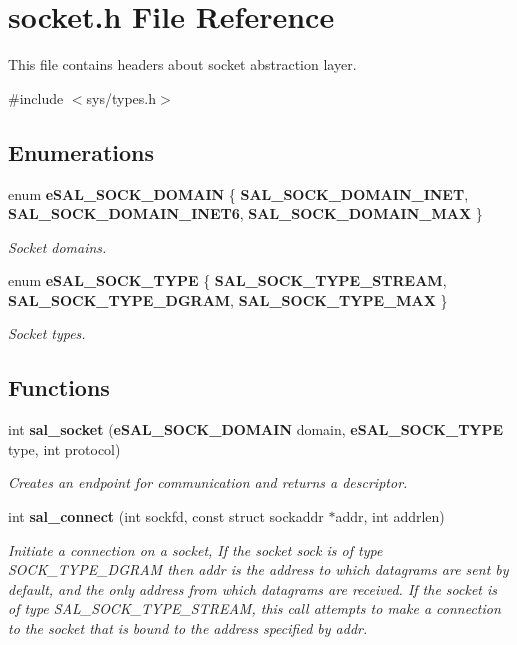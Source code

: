 \section{socket.h File Reference}
\label{socket_8h}


This file contains headers about socket abstraction layer.  


{\ttfamily \#include $<$sys/types.h$>$}\par
\subsection*{Enumerations}
\begin{DoxyCompactItemize}
\item 
enum {\bf eSAL\_\-SOCK\_\-DOMAIN} \{ {\bfseries SAL\_\-SOCK\_\-DOMAIN\_\-INET}, 
{\bfseries SAL\_\-SOCK\_\-DOMAIN\_\-INET6}, 
{\bfseries SAL\_\-SOCK\_\-DOMAIN\_\-MAX}
 \}
\begin{DoxyCompactList}\small\item\em Socket domains. \end{DoxyCompactList}\item 
enum {\bf eSAL\_\-SOCK\_\-TYPE} \{ {\bfseries SAL\_\-SOCK\_\-TYPE\_\-STREAM}, 
{\bfseries SAL\_\-SOCK\_\-TYPE\_\-DGRAM}, 
{\bfseries SAL\_\-SOCK\_\-TYPE\_\-MAX}
 \}
\begin{DoxyCompactList}\small\item\em Socket types. \end{DoxyCompactList}\end{DoxyCompactItemize}
\subsection*{Functions}
\begin{DoxyCompactItemize}
\item 
int {\bf sal\_\-socket} ({\bf eSAL\_\-SOCK\_\-DOMAIN} domain, {\bf eSAL\_\-SOCK\_\-TYPE} type, int protocol)
\begin{DoxyCompactList}\small\item\em Creates an endpoint for communication and returns a descriptor. \end{DoxyCompactList}\item 
int {\bf sal\_\-connect} (int sockfd, const struct sockaddr $\ast$addr, int addrlen)
\begin{DoxyCompactList}\small\item\em Initiate a connection on a socket, If the socket sock is of type SOCK\_\-TYPE\_\-DGRAM then addr is the address to which datagrams are sent by default, and the only address from which datagrams are received. If the socket is of type SAL\_\-SOCK\_\-TYPE\_\-STREAM, this call attempts to make a connection to the socket that is bound to the address specified by addr. \end{DoxyCompactList}\end{DoxyCompactItemize}


